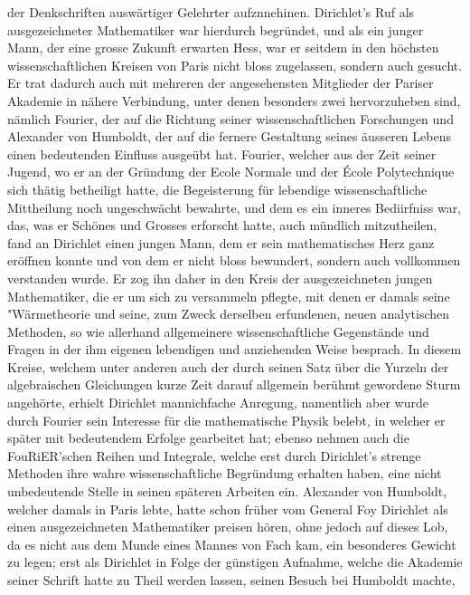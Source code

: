 \documentclass[11pt]{article}
\begin{document}
\noindent der Denkschriften auswärtiger Gelehrter aufznnehinen. Dirichlet’s Ruf als ausgezeichneter Mathematiker war hierdurch begründet, und als ein junger Mann, der eine grosse Zukunft erwarten Hess, war er seitdem in den höchsten wissenschaftlichen Kreisen von Paris nicht bloss zugelassen, sondern auch gesucht. Er trat dadurch auch mit mehreren der angesehensten Mitglieder der Pariser Akademie in nähere Verbindung, unter denen besonders zwei hervorzuheben sind, nämlich Fourier, der auf die Richtung seiner wissenschaftlichen Forschungen und Alexander von Humboldt, der auf die fernere Gestaltung seines äusseren Lebens einen bedeutenden Einfluss ausgeübt hat. Fourier, welcher aus der Zeit seiner Jugend, wo er an der Gründung der Ecole Normale und der École Polytechnique sich thätig betheiligt hatte, die Begeisterung für lebendige wissenschaftliche Mittheilung noch ungeschwächt bewahrte, und dem es ein inneres Bediirfniss war, das, was er Schönes und Grosses erforscht hatte, auch mündlich mitzutheilen, fand an Dirichlet einen jungen Mann, dem er sein mathematisches Herz ganz eröffnen konnte und von dem er nicht bloss bewundert, sondern auch vollkommen verstanden wurde. Er zog ihn daher in den Kreis der ausgezeichneten jungen Mathematiker, die er um sich zu versammeln pflegte, mit denen er damals seine "Wärmetheorie und seine, zum Zweck derselben erfundenen, neuen analytischen Methoden, so wie allerhand allgemeinere wissenschaftliche Gegenstände und Fragen in der ihm eigenen lebendigen und anziehenden Weise besprach. In diesem Kreise, welchem unter anderen auch der durch seinen Satz über die   Yurzeln der algebraischen Gleichungen kurze Zeit darauf allgemein berühmt gewordene Sturm angehörte, erhielt Dirichlet mannichfache Anregung, namentlich aber wurde durch Fourier sein Interesse für die mathematische Physik belebt, in welcher er später mit bedeutendem Erfolge gearbeitet hat; ebenso nehmen auch die FouRiER’schen Reihen und Integrale, welche erst durch Dirichlet’s strenge Methoden ihre wahre wissenschaftliche Begründung erhalten haben, eine nicht unbedeutende Stelle in seinen späteren Arbeiten ein. Alexander von Humboldt, welcher damals in Paris lebte, hatte schon früher vom General Foy Dirichlet als einen ausgezeichneten Mathematiker preisen hören, ohne jedoch auf dieses Lob, da es nicht aus dem Munde eines Mannes von Fach kam, ein besonderes Gewicht zu legen; erst als Dirichlet in Folge der günstigen Aufnahme, welche die Akademie seiner Schrift hatte zu Theil werden lassen, seinen Besuch bei Humboldt machte,
\par
\end{document}
